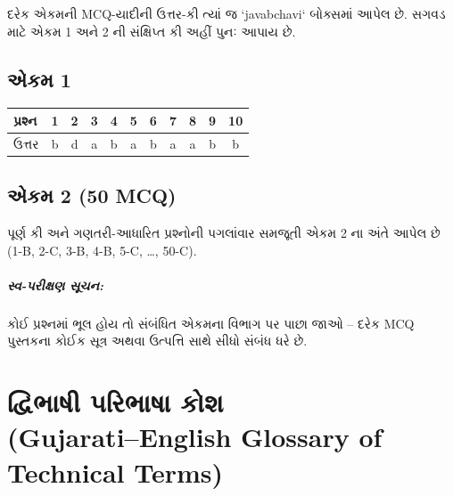 દરેક એકમની MCQ-યાદીની ઉત્તર-કી ત્યાં જ `javabchavi` બોક્સમાં આપેલ છે. સગવડ માટે એકમ 1 અને 2 ની
સંક્ષિપ્ત કી અહીં પુનઃ આપાય છે.

\section*{એકમ 1}
\begin{center}
\begin{tabular}{@{}l*{10}{c}@{}}
\toprule
પ્રશ્ન & 1 & 2 & 3 & 4 & 5 & 6 & 7 & 8 & 9 & 10\\
\midrule
ઉત્તર & b & d & a & b & a & b & a & a & b & b\\
\bottomrule
\end{tabular}
\end{center}

\section*{એકમ 2 (50 MCQ)}
પૂર્ણ કી અને ગણતરી-આધારિત પ્રશ્નોની પગલાંવાર સમજૂતી એકમ 2 ના અંતે આપેલ છે
(1-B, 2-C, 3-B, 4-B, 5-C, \dots, 50-C).

\paragraph{સ્વ-પરીક્ષણ સૂચન:} કોઈ પ્રશ્નમાં ભૂલ હોય તો સંબંધિત એકમના વિભાગ પર પાછા જાઓ --
દરેક MCQ પુસ્તકના કોઈક સૂત્ર અથવા ઉત્પત્તિ સાથે સીધો સંબંધ ધરે છે.

\chapter[પરિશિષ્ટ D : પરિભાષા કોશ]{દ્વિભાષી પરિભાષા કોશ\\{\large (Gujarati--English Glossary of Technical Terms)}}
\label{app:glossary}

